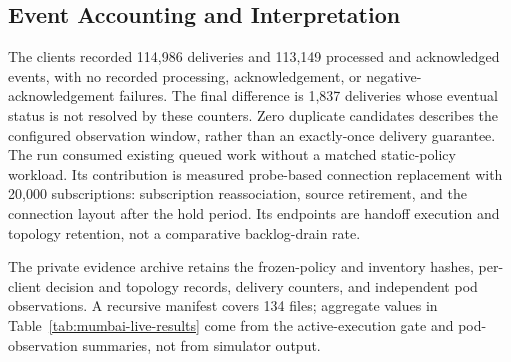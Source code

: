 \subsection{Event Accounting and Interpretation}

The clients recorded 114,986 deliveries and 113,149 processed and acknowledged
events, with no recorded processing, acknowledgement, or negative-
acknowledgement failures. The final difference is 1,837 deliveries whose
eventual status is not resolved by these counters. Zero duplicate candidates
describes the configured observation window, rather than an exactly-once
delivery guarantee. The run consumed existing queued work without a matched
static-policy workload. Its contribution is measured probe-based connection
replacement with 20,000 subscriptions: subscription reassociation, source
retirement, and the connection layout after the hold period. Its endpoints
are handoff execution and topology retention, not a comparative backlog-drain
rate.

The private evidence archive retains the frozen-policy and inventory hashes,
per-client decision and topology records, delivery counters, and independent
pod observations. A recursive manifest covers 134 files; aggregate values in
Table~\ref{tab:mumbai-live-results} come from the active-execution gate and
pod-observation summaries, not from simulator output.





